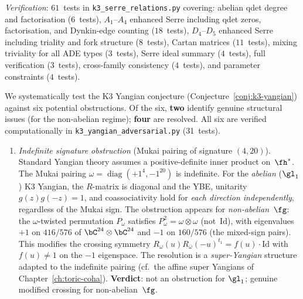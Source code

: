 \noindent\textit{Verification}: $61$~tests in
\texttt{k3\_serre\_relations.py}
covering: abelian qdet degree and factorisation ($6$~tests),
$A_1$--$A_4$ enhanced Serre including qdet zeros, factorisation,
and Dynkin-edge counting ($18$~tests),
$D_4$--$D_5$ enhanced Serre including triality and fork structure
($8$~tests), Cartan matrices ($11$~tests), mixing triviality for all
ADE types ($3$~tests), Serre ideal summary ($4$~tests),
full verification ($3$~tests), cross-family consistency ($4$~tests),
and parameter constraints ($4$~tests).



\begin{remark}
\label{rem:k3-yangian-adversarial}
We systematically test the K3 Yangian conjecture (Conjecture~\ref{conj:k3-yangian})
against six potential obstructions.  Of the six, \textbf{two} identify
genuine structural issues (for the non-abelian regime); \textbf{four}
are resolved.  All six are verified computationally
in \texttt{k3\_yangian\_adversarial.py} (31~tests).
\begin{enumerate}[label=\textbf{A\arabic*.}, leftmargin=2.5em]

\item \emph{Indefinite signature obstruction} (Mukai pairing of signature
$(4,20)$).
Standard Yangian theory assumes a positive-definite inner product
on~$\fh^*$.  The Mukai pairing $\omega = \operatorname{diag}(+1^4, -1^{20})$
is indefinite.  For the \emph{abelian} ($\gl_1$) K3 Yangian, the $R$-matrix
is diagonal and the YBE, unitarity $g(z)g(-z) = 1$, and coassociativity
hold for \emph{each direction independently}, regardless of the Mukai sign.
The obstruction appears for \emph{non-abelian}~$\fg$: the $\omega$-twisted
permutation $P_\omega$ satisfies $P_\omega^2 = \omega \otimes \omega$
(not~$\mathrm{Id}$), with eigenvalues $+1$ on $416/576$ of
$\bC^{24} \otimes \bC^{24}$ and $-1$ on $160/576$ (the mixed-sign
pairs).  This modifies the crossing symmetry
$R_\omega(u) R_\omega(-u)^{t_1} = f(u) \cdot \mathrm{Id}$ with
$f(u) \neq 1$ on the $-1$ eigenspace.
The resolution is a \emph{super-Yangian} structure adapted to the
indefinite pairing (cf.\ the affine super Yangians
of Chapter~\ref{ch:toric-coha}).
\textbf{Verdict}: not an obstruction for $\gl_1$; genuine modified
crossing for non-abelian~$\fg$.


\end{enumerate}
\end{remark}
